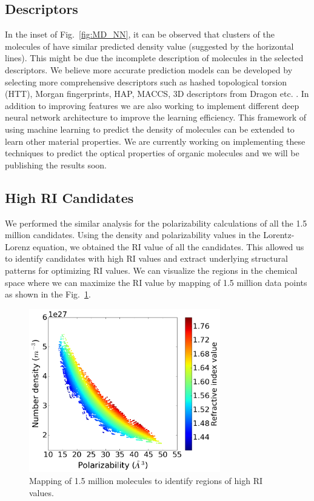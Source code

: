 \subsection{Descriptors}
\label{subsec:descriptors}

In the inset of Fig.\ \ref{fig:MD_NN}, it can be observed that clusters of the molecules of have similar predicted density value (suggested by the horizontal lines). This might be due the incomplete description of molecules in the selected descriptors. We believe more accurate prediction models can be developed by selecting more comprehensive descriptors such as hashed topological torsion (HTT), Morgan fingerprints, HAP, MACCS, 3D descriptors from Dragon etc. \cite{Taletesrl2011}. In addition to improving features we are also working to implement different deep neural network architecture to improve the learning efficiency. This framework of using machine learning to predict the density of molecules can be extended to learn other material properties. We are currently working on implementing these techniques to predict the optical properties of organic molecules and we will be publishing the results soon.


\subsection{High RI Candidates}
\label{subsec:descriptors}

We performed the similar analysis for the polarizability calculations of all the 1.5 million candidates. Using the density and polarizability values in the Lorentz-Lorenz equation, we obtained the RI value of all the candidates. This allowed us to identify candidates with high RI values and extract underlying structural patterns for optimizing RI values. We can visualize the regions in the chemical space where we can maximize the RI value by mapping of 1.5 million data points as shown in the Fig.\ \ref{fig:pol_den_comp}.

\begin{figure}[htbp] 
	\centering
	\includegraphics[width=0.744\textwidth]{Chapter-6/Figures/Pol_vs_den.png}
	\caption{Mapping of 1.5 million molecules to identify regions of high RI values.} 
	\label{fig:pol_den_comp} 
\end{figure}  

